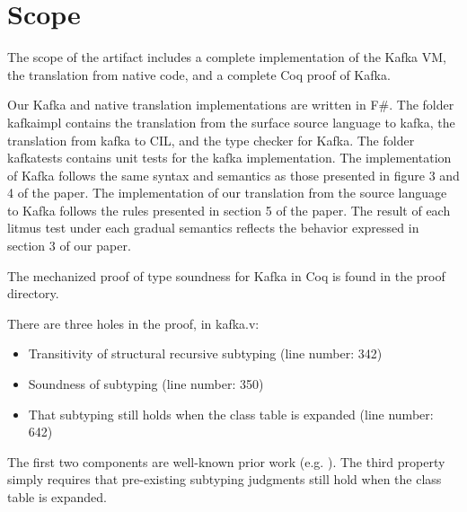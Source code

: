 \documentclass[a4paper,UKenglish]{darts-v2018}
\newenvironment{scope}{\section{Scope}}{}
\begin{document}
\begin{scope}
The scope of the artifact includes a complete implementation of the Kafka VM, the translation from native code, and a complete Coq proof of Kafka.

Our Kafka and native translation implementations are written in F$\#$. The folder kafkaimpl contains the translation from the surface source language to kafka, the translation from kafka to CIL, and the type checker for Kafka. The folder kafkatests contains unit tests for the kafka implementation. The implementation of Kafka follows the same syntax and semantics as those presented in figure 3 and 4 of the paper. The implementation of our translation from the source language to Kafka follows the rules presented in section 5 of the paper. The result of each litmus test under each gradual semantics reflects the behavior expressed in section 3 of our paper.

The mechanized proof of type soundness for Kafka in Coq is found in the proof directory.






There are three holes in the proof, in kafka.v:
\begin{itemize}
	\item Transitivity of structural recursive subtyping (line number: 342)
	\item Soundness of subtyping (line number: 350)
	\item That subtyping still holds when the class table is expanded (line number: 642)
\end{itemize}

The first two components are well-known prior work (e.g. \cite{JonesSoundSub}). 
The third property simply requires that pre-existing subtyping judgments still hold when the class table is expanded.
\end{scope}
\end{document}
